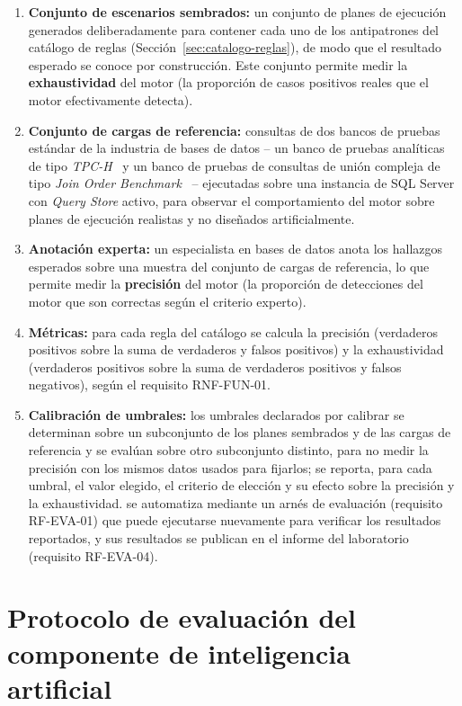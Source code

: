 \documentclass[11pt,a4paper]{report}
\begin{document}
\begin{enumerate}
\item \textbf{Conjunto de escenarios sembrados:} un conjunto de planes de ejecuci\'on generados deliberadamente para contener cada uno de los antipatrones del cat\'alogo de reglas (Secci\'on~\ref{sec:catalogo-reglas}), de modo que el resultado esperado se conoce por construcci\'on. Este conjunto permite medir la \textbf{exhaustividad} del motor (la proporci\'on de casos positivos reales que el motor efectivamente detecta).
\item \textbf{Conjunto de cargas de referencia:} consultas de dos bancos de pruebas est\'andar de la industria de bases de datos -- un banco de pruebas anal\'iticas de tipo \textit{TPC-H}~\cite{R21} y un banco de pruebas de consultas de uni\'on compleja de tipo \textit{Join Order Benchmark}~\cite{R20} -- ejecutadas sobre una instancia de SQL Server con \textit{Query Store} activo, para observar el comportamiento del motor sobre planes de ejecuci\'on realistas y no dise\~nados artificialmente.
\item \textbf{Anotaci\'on experta:} un especialista en bases de datos anota los hallazgos esperados sobre una muestra del conjunto de cargas de referencia, lo que permite medir la \textbf{precisi\'on} del motor (la proporci\'on de detecciones del motor que son correctas seg\'un el criterio experto).
\item \textbf{M\'etricas:} para cada regla del cat\'alogo se calcula la precisi\'on (verdaderos positivos sobre la suma de verdaderos y falsos positivos) y la exhaustividad (verdaderos positivos sobre la suma de verdaderos positivos y falsos negativos), seg\'un el requisito RNF-FUN-01.
\item \textbf{Calibraci\'on de umbrales:} los umbrales declarados por calibrar se determinan sobre un subconjunto de los planes sembrados y de las cargas de referencia y se eval\'uan sobre otro subconjunto distinto, para no medir la precisi\'on con los mismos datos usados para fijarlos; se reporta, para cada umbral, el valor elegido, el criterio de elecci\'on y su efecto sobre la precisi\'on y la exhaustividad. se automatiza mediante un arn\'es de evaluaci\'on (requisito RF-EVA-01) que puede ejecutarse nuevamente para verificar los resultados reportados, y sus resultados se publican en el informe del laboratorio (requisito RF-EVA-04).
\end{enumerate}

\section{Protocolo de evaluaci\'on del componente de inteligencia artificial}
\label{sec:verificacion-ia}
\end{document}
